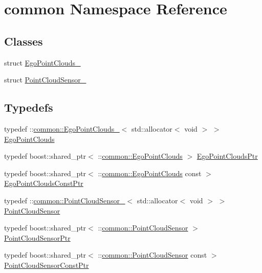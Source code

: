 \hypertarget{namespacecommon}{}\section{common Namespace Reference}
\label{namespacecommon}
\subsection*{Classes}
\begin{DoxyCompactItemize}
\item 
struct \hyperlink{structcommon_1_1EgoPointClouds__}{Ego\+Point\+Clouds\+\_\+}
\item 
struct \hyperlink{structcommon_1_1PointCloudSensor__}{Point\+Cloud\+Sensor\+\_\+}
\end{DoxyCompactItemize}
\subsection*{Typedefs}
\begin{DoxyCompactItemize}
\item 
typedef \+::\hyperlink{structcommon_1_1EgoPointClouds__}{common\+::\+Ego\+Point\+Clouds\+\_\+}$<$ std\+::allocator$<$ void $>$ $>$ \hyperlink{namespacecommon_a6cbd2086f9b345d169e432c35ffecf4d}{Ego\+Point\+Clouds}
\item 
typedef boost\+::shared\+\_\+ptr$<$ \+::\hyperlink{namespacecommon_a6cbd2086f9b345d169e432c35ffecf4d}{common\+::\+Ego\+Point\+Clouds} $>$ \hyperlink{namespacecommon_a079a4e76c38ec190f07e5cd2b7da05e0}{Ego\+Point\+Clouds\+Ptr}
\item 
typedef boost\+::shared\+\_\+ptr$<$ \+::\hyperlink{namespacecommon_a6cbd2086f9b345d169e432c35ffecf4d}{common\+::\+Ego\+Point\+Clouds} const  $>$ \hyperlink{namespacecommon_ac9ac5560cc07d92a2ece5e0a9f70952c}{Ego\+Point\+Clouds\+Const\+Ptr}
\item 
typedef \+::\hyperlink{structcommon_1_1PointCloudSensor__}{common\+::\+Point\+Cloud\+Sensor\+\_\+}$<$ std\+::allocator$<$ void $>$ $>$ \hyperlink{namespacecommon_a493470d1acdb35b20776bd075266358e}{Point\+Cloud\+Sensor}
\item 
typedef boost\+::shared\+\_\+ptr$<$ \+::\hyperlink{namespacecommon_a493470d1acdb35b20776bd075266358e}{common\+::\+Point\+Cloud\+Sensor} $>$ \hyperlink{namespacecommon_a7d3f864e41d4e734cba72e7ae91a0b9e}{Point\+Cloud\+Sensor\+Ptr}
\item 
typedef boost\+::shared\+\_\+ptr$<$ \+::\hyperlink{namespacecommon_a493470d1acdb35b20776bd075266358e}{common\+::\+Point\+Cloud\+Sensor} const  $>$ \hyperlink{namespacecommon_ab9d5f19cc1df76e97ea53d81e8eb3d87}{Point\+Cloud\+Sensor\+Const\+Ptr}
\end{DoxyCompactItemize}
